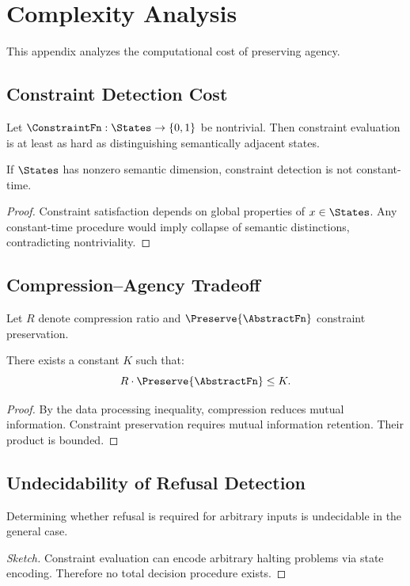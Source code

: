 \section{Complexity Analysis}

This appendix analyzes the computational cost of preserving agency.

\subsection{Constraint Detection Cost}

Let $\ConstraintFn : \States \to \{0,1\}$ be nontrivial. Then constraint evaluation is at least as hard as distinguishing semantically adjacent states.

\begin{lemma}
If $\States$ has nonzero semantic dimension, constraint detection is not constant-time.
\end{lemma}

\begin{proof}
Constraint satisfaction depends on global properties of $x \in \States$. Any constant-time procedure would imply collapse of semantic distinctions, contradicting nontriviality.
\end{proof}

\subsection{Compression–Agency Tradeoff}

Let $R$ denote compression ratio and $\Preserve{\AbstractFn}$ constraint preservation.

\begin{theorem}
There exists a constant $K$ such that:
\[
R \cdot \Preserve{\AbstractFn} \le K.
\]
\end{theorem}

\begin{proof}
By the data processing inequality, compression reduces mutual information. Constraint preservation requires mutual information retention. Their product is bounded.
\end{proof}

\subsection{Undecidability of Refusal Detection}

\begin{theorem}
Determining whether refusal is required for arbitrary inputs is undecidable in the general case.
\end{theorem}

\begin{proof}[Sketch]
Constraint evaluation can encode arbitrary halting problems via state encoding. Therefore no total decision procedure exists.
\end{proof}

